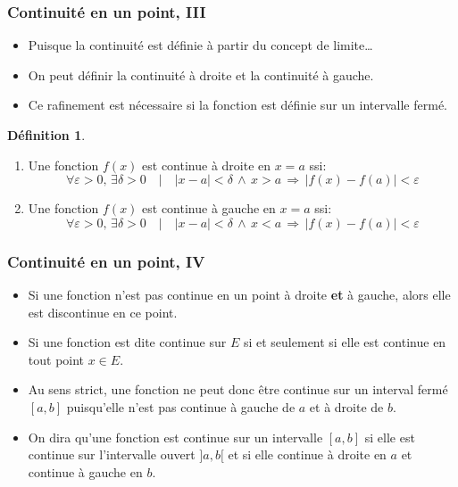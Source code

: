 \documentclass[10pt,notheorems]{beamer}
\theoremstyle{plain}
\theoremstyle{definition} %
\newtheorem{definition}{Définition}
\begin{document}
\begin{frame}
  \frametitle{Continuité en un point, III}

  \begin{itemize}

  \item Puisque la continuité est définie à partir du concept de limite\ldots\newline

  \item On peut définir la continuité à droite et la continuité à gauche.\newline

  \item Ce rafinement est nécessaire si la fonction est définie sur un intervalle fermé.\newline

  \end{itemize}


  \begin{definition}
    \begin{enumerate}
    \item Une fonction $f(x)$ est continue à droite en $x=a$ ssi:
      \[
        \forall \varepsilon>0,\, \exists \delta>0\quad |\quad |x-a|<\delta\,\land\,x>a\, \Rightarrow\, |f(x)-f(a)|<\varepsilon
      \]
    \item Une fonction $f(x)$ est continue à gauche en $x=a$ ssi:
      \[
        \forall \varepsilon>0,\, \exists \delta>0\quad |\quad |x-a|<\delta\,\land\,x<a\, \Rightarrow\, |f(x)-f(a)|<\varepsilon
      \]
    \end{enumerate}
  \end{definition}

\end{frame}


\begin{frame}
  \frametitle{Continuité en un point, IV}

  \begin{itemize}

  \item Si une fonction n'est pas continue en un point à droite \textbf{et} à gauche, alors elle est discontinue en ce point.\newline

  \item Si une fonction est dite continue sur $E$ si et seulement si elle est continue en tout point $x\in E$.\newline

  \item Au sens strict, une fonction ne peut donc être continue sur un interval fermé $[a, b]$ puisqu'elle n'est pas continue à gauche de $a$ et à droite de $b$.\newline

  \item On dira qu'une fonction est continue sur un intervalle $[a,b]$ si elle est continue sur l'intervalle ouvert $]a,b[$ et si elle continue à droite en $a$ et continue à gauche en $b$.

  \end{itemize}

\end{frame}
\end{document}

